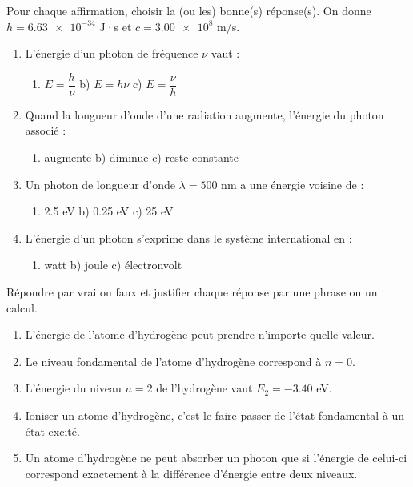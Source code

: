 \documentclass[11pt]{article}
\begin{document}
\begin{exercice}
Pour chaque affirmation, choisir la (ou les) bonne(s) réponse(s). On donne $h = \num{6,63e-34}$ J·s et $c = \num{3,00e8}$ m/s.
\begin{enumerate}
\item L'énergie d'un photon de fréquence $\nu$ vaut :
\begin{enumerate}
\item $E = \dfrac{h}{\nu}$ \quad b) $E = h\nu$ \quad c) $E = \dfrac{\nu}{h}$
\end{enumerate}
\item Quand la longueur d'onde d'une radiation augmente, l'énergie du photon associé :
\begin{enumerate}
\item augmente \quad b) diminue \quad c) reste constante
\end{enumerate}
\item Un photon de longueur d'onde $\lambda = \num{500}$ nm a une énergie voisine de :
\begin{enumerate}
\item \num{2,5} eV \quad b) \num{0,25} eV \quad c) \num{25} eV
\end{enumerate}
\item L'énergie d'un photon s'exprime dans le système international en :
\begin{enumerate}
\item watt \quad b) joule \quad c) électronvolt
\end{enumerate}
\end{enumerate}
\end{exercice}

\begin{exercice}
Répondre par vrai ou faux et justifier chaque réponse par une phrase ou un calcul.
\begin{enumerate}
\item L'énergie de l'atome d'hydrogène peut prendre n'importe quelle valeur.
\item Le niveau fondamental de l'atome d'hydrogène correspond à $n = 0$.
\item L'énergie du niveau $n = 2$ de l'hydrogène vaut $E_2 = -\num{3,40}$ eV.
\item Ioniser un atome d'hydrogène, c'est le faire passer de l'état fondamental à un état excité.
\item Un atome d'hydrogène ne peut absorber un photon que si l'énergie de celui-ci correspond exactement à la différence d'énergie entre deux niveaux.
\end{enumerate}
\end{exercice}
\end{document}
